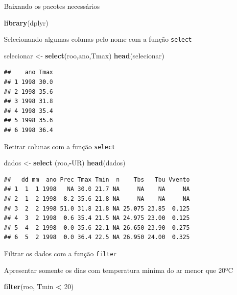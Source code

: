 \documentclass[
]{book}
\newenvironment{Shaded}{\begin{snugshade}}{\end{snugshade}}
\newcommand{\DecValTok}[1]{\textcolor[rgb]{0.00,0.00,0.81}{#1}}
\newcommand{\KeywordTok}[1]{\textcolor[rgb]{0.13,0.29,0.53}{\textbf{#1}}}
\newcommand{\NormalTok}[1]{#1}
\newcommand{\OperatorTok}[1]{\textcolor[rgb]{0.81,0.36,0.00}{\textbf{#1}}}
\newcommand{\StringTok}[1]{\textcolor[rgb]{0.31,0.60,0.02}{#1}}
\begin{document}
Baixando os pacotes necessários

\begin{Shaded}
\begin{Highlighting}[]
\KeywordTok{library}\NormalTok{(dplyr)}
\end{Highlighting}
\end{Shaded}

Selecionando algumas colunas pelo nome com a função \texttt{select}

\begin{Shaded}
\begin{Highlighting}[]
\NormalTok{selecionar <-}\StringTok{ }\KeywordTok{select}\NormalTok{(roo,ano,Tmax)}
\KeywordTok{head}\NormalTok{(selecionar)}
\end{Highlighting}
\end{Shaded}

\begin{verbatim}
##    ano Tmax
## 1 1998 30.0
## 2 1998 35.6
## 3 1998 31.8
## 4 1998 35.4
## 5 1998 35.6
## 6 1998 36.4
\end{verbatim}

Retirar colunas com a função \texttt{select}

\begin{Shaded}
\begin{Highlighting}[]
\NormalTok{dados <-}\StringTok{ }\KeywordTok{select}\NormalTok{ (roo,}\OperatorTok{-}\NormalTok{UR)}
\KeywordTok{head}\NormalTok{(dados)}
\end{Highlighting}
\end{Shaded}

\begin{verbatim}
##   dd mm  ano Prec Tmax Tmin  n    Tbs   Tbu Vvento
## 1  1  1 1998   NA 30.0 21.7 NA     NA    NA     NA
## 2  1  2 1998  8.2 35.6 21.8 NA     NA    NA     NA
## 3  2  2 1998 51.0 31.8 21.8 NA 25.075 23.85  0.125
## 4  3  2 1998  0.6 35.4 21.5 NA 24.975 23.00  0.125
## 5  4  2 1998  0.0 35.6 22.1 NA 26.650 23.90  0.275
## 6  5  2 1998  0.0 36.4 22.5 NA 26.950 24.00  0.325
\end{verbatim}

Filtrar os dados com a função \texttt{filter}

Apresentar somente os dias com temperatura minima do ar menor que 20ºC

\begin{Shaded}
\begin{Highlighting}[]
\KeywordTok{filter}\NormalTok{(roo, Tmin }\OperatorTok{<}\StringTok{ }\DecValTok{20}\NormalTok{)}
\end{Highlighting}
\end{Shaded}
\end{document}
